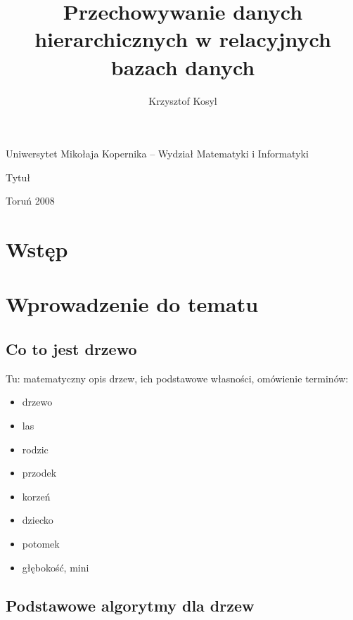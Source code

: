 \documentclass[10pt,a4paper,oneside]{book}
\author{Krzysztof Kosyl}
\title{Przechowywanie danych hierarchicznych w relacyjnych bazach danych}
\begin{document}
\begin{titlepage}
\begin{center}
 Uniwersytet Mikołaja Kopernika -- Wydział Matematyki i Informatyki
\end{center}
\vfill
\begin{center}
 \large{Tytuł}
\end{center}

\vfill
\begin{center}
 Toruń 2008
\end{center}
\end{titlepage}


\maketitle{}

\tableofcontents{}

\chapter{Wstęp}




\chapter{Wprowadzenie do tematu}

\section{Co to jest drzewo}

Tu: matematyczny opis drzew, ich podstawowe własności, omówienie terminów:
\begin{itemize}
 \item drzewo
 \item las
 \item rodzic
 \item przodek
 \item korzeń
 \item dziecko
 \item potomek
 \item głębokość, mini
\end{itemize}



\section{Podstawowe algorytmy dla drzew}
\end{document}
